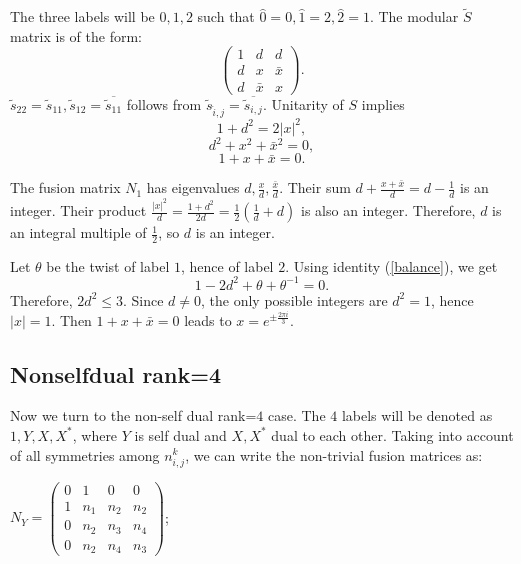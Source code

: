 \documentclass[12pt,psamsfonts]{amsart}
\newcommand{\ts}{\tilde{s}}
\numberwithin{equation}{section}
\theoremstyle{definition}
\begin{document}
The three labels will be $0,1,2$ such that $\hat{0}=0,\hat{1}=2,
\hat{2}=1$.  The modular $\tilde{S}$ matrix is of the form:
\[
 \begin{pmatrix}
   1& d&d \\
   d& x &\bar{x}\\
   d&\bar{x} &x
 \end{pmatrix}.
 \]
 $\tilde{s}_{22}=\tilde{s}_{11},\ts_{12}=\overline{\ts_{11}}$ follows from
 $\tilde{s}_{\hat{i},j}=\overline{\ts_{i,j}}$.
 Unitarity of $S$ implies
 \begin{equation}\label{orth1}
 1+d^2=2|x|^2,
 \end{equation}
 \begin{equation}\label{orth2}
 d^2+x^2+\bar{x}^2=0,
 \end{equation}
 \begin{equation}\label{orth3}
 1+x+\bar{x}=0.
 \end{equation}

 The fusion matrix $N_1$ has eigenvalues
 $d,\frac{x}{d},\frac{\bar{x}}{d}$.  Their sum $d+\frac{x+\bar{x}}{d}=d- \frac{1}{d}$ is an
 integer.  Their product $\frac{|x|^2}{d}=\frac{1+d^2}{2d}=\frac{1}{2}(\frac{1}{d}+d)$ is also an integer.
 Therefore, $d$ is an integral multiple of $\frac{1}{2}$, so
 $d$ is an integer.

 Let $\theta$ be the twist of label $1$, hence of label $2$.  Using identity
 (\ref{balance}), we get
 \begin{equation}
 1-2d^2+\theta+\theta^{-1}=0.
 \end{equation}
 Therefore, $2d^2\leq 3$.  Since $d\neq 0$, the only possible
 integers are
$d^2=1$, hence $|x|=1$.  Then $1+x+\bar{x}=0$ leads to $x=e^{\pm
\frac{2\pi i}{3}}.$

\subsection{Nonselfdual rank=4}

Now we turn to the non-self dual rank=$4$ case.  The $4$ labels
will be denoted as $1,Y,X,X^*$, where $Y$ is self dual and $X,X^*$
dual to each other.  Taking into account of all symmetries among
$n_{i,j}^k$, we can write the non-trivial fusion matrices as:

$
 N_Y=\begin{pmatrix}
   0&1& 0&0 \\
   1&n_1& n_2 &n_2\\
   0 &n_2&n_3&n_4\\
   0 &n_2&n_4&n_3
 \end{pmatrix}$;
\end{document}
